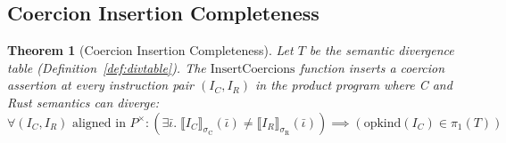 \documentclass[11pt]{article}
\newtheorem{theorem}{Theorem}[section]
\newcommand{\SemConfigC}{\sigma_{\mathrm{C}}}
\newcommand{\SemConfigR}{\sigma_{\mathrm{R}}}
\newcommand{\opkind}{\mathrm{opkind}}
\begin{document}
\subsection{Coercion Insertion Completeness}

\begin{theorem}[Coercion Insertion Completeness]
\label{thm:coercion-complete}
Let $T$ be the semantic divergence table (Definition~\ref{def:divtable}). The $\mathrm{InsertCoercions}$ function inserts a coercion assertion at every instruction pair $(I_C, I_R)$ in the product program where C and Rust semantics can diverge:
\[
\forall (I_C, I_R) \text{ aligned in } P^\times : (\exists \bar{\iota}.\; \llbracket I_C \rrbracket_{\SemConfigC}(\bar{\iota}) \neq \llbracket I_R \rrbracket_{\SemConfigR}(\bar{\iota})) \implies (\opkind(I_C) \in \pi_1(T))
\]
\end{theorem}
\end{document}
